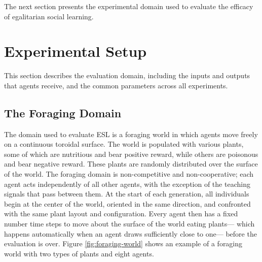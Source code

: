 \documentclass{sig-alternate}
\begin{document}


The next section presents the experimental domain used to evaluate the efficacy of egalitarian social learning.

\section{Experimental Setup}
\label{sec:setup}
This section describes the evaluation domain, including the inputs and outputs that agents receive, and the common parameters across all experiments.

\subsection*{The Foraging Domain}
The domain used to evaluate ESL is a foraging world in which agents move freely on a continuous toroidal surface. The world is populated with various plants, some of which are nutritious and bear positive reward, while others are poisonous and bear negative reward. These plants are randomly distributed over the surface of the world. The foraging domain is non-competitive and non-cooperative; each agent acts independently of all other agents, with the exception of the teaching signals that pass between them. At the start of each generation, all individuals begin at the center of the world, oriented in the same direction, and confronted with the same plant layout and configuration. Every agent then has a fixed number time steps to move about the surface of the world eating plants--- which happens automatically when an agent draws sufficiently close to one--- before the evaluation is over. Figure \ref{fig:foraging-world} shows an example of a foraging world with two types of plants and eight agents.
    
\end{document}
